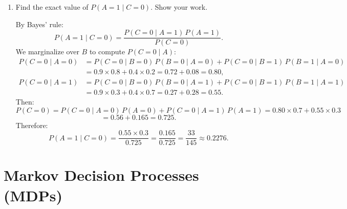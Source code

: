 \begin{enumerate}
  \item \points[4] Find the exact value of $P(A=1\mid C=0)$. Show your work.

  \begin{solution}
  By Bayes' rule:
  \[
    P(A=1\mid C=0) = \frac{P(C=0\mid A=1)\,P(A=1)}{P(C=0)}.
  \]
  We marginalize over $B$ to compute $P(C=0\mid A)$:
  \begin{align*}
    P(C=0\mid A=0) &= P(C=0\mid B=0)\,P(B=0\mid A=0) + P(C=0\mid B=1)\,P(B=1\mid A=0) \\
                   &= 0.9 \times 0.8 + 0.4 \times 0.2 = 0.72 + 0.08 = 0.80,\\[4pt]
    P(C=0\mid A=1) &= P(C=0\mid B=0)\,P(B=0\mid A=1) + P(C=0\mid B=1)\,P(B=1\mid A=1) \\
                   &= 0.9 \times 0.3 + 0.4 \times 0.7 = 0.27 + 0.28 = 0.55.
  \end{align*}
  Then:
  \[
    P(C=0) = P(C=0\mid A=0)\,P(A=0) + P(C=0\mid A=1)\,P(A=1)
           = 0.80\times 0.7 + 0.55\times 0.3
  \]
  \[= 0.56 + 0.165 = 0.725.\]
  Therefore:
  \[
    P(A=1\mid C=0) = \frac{0.55 \times 0.3}{0.725} = \frac{0.165}{0.725} = \frac{33}{145} \approx 0.2276.
  \]
  \end{solution}
\end{enumerate}
\clearpage

\clearpage
\section{Markov Decision Processes (MDPs)}
